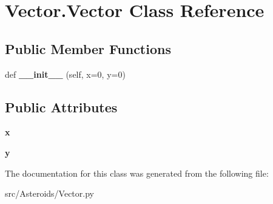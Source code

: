 \hypertarget{classVector_1_1Vector}{}\section{Vector.\+Vector Class Reference}
\label{classVector_1_1Vector}
\subsection*{Public Member Functions}
\begin{DoxyCompactItemize}
\item 
def {\bfseries \+\_\+\+\_\+init\+\_\+\+\_\+} (self, x=0, y=0)\hypertarget{classVector_1_1Vector_a53f3e407d6040c60bbb2faa503243218}{}\label{classVector_1_1Vector_a53f3e407d6040c60bbb2faa503243218}

\end{DoxyCompactItemize}
\subsection*{Public Attributes}
\begin{DoxyCompactItemize}
\item 
{\bfseries x}\hypertarget{classVector_1_1Vector_a7f3c3f2b1e0b9e3b97a4f9991a76e0b2}{}\label{classVector_1_1Vector_a7f3c3f2b1e0b9e3b97a4f9991a76e0b2}

\item 
{\bfseries y}\hypertarget{classVector_1_1Vector_a61e9316c753c3d76705841e0d009e4b6}{}\label{classVector_1_1Vector_a61e9316c753c3d76705841e0d009e4b6}

\end{DoxyCompactItemize}


The documentation for this class was generated from the following file\+:\begin{DoxyCompactItemize}
\item 
src/\+Asteroids/Vector.\+py\end{DoxyCompactItemize}
